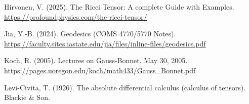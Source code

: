 \begin{bookreferences}
  \item Hirvonen, V. (2025). The Ricci Tensor: A complete Guide with Examples.
    \url{https://profoundphysics.com/the-ricci-tensor/}
  \item Jia, Y.-B. (2024). Geodesics (COMS 4770/5770 Notes).
    \url{https://faculty.sites.iastate.edu/jia/files/inline-files/geodesics.pdf}
  \item Koch, R. (2005). Lectures on Gauss-Bonnet. May 30, 2005.
    \url{https://pages.uoregon.edu/koch/math433/Gauss_Bonnet.pdf}
  \item Levi-Civita, T. (1926). The absolute differential calculus (calculus of tensors). Blackie \& Son.
\end{bookreferences}
